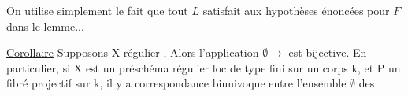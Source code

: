 On utilise simplement le fait que tout $\underline{L}$ satisfait aux 
hypothèses énoncées pour $\underline{F}$ dans le lemme...

\uline{Corollaire}  Supposons  X régulier\hand{)} , Alors l'application $\emptyset \to$  est bijective. En particulier, si X est
un préschéma régulier loc de type fini sur un corps k, et P un fibré
projectif sur k, il y a correspondance biunivoque entre l'ensemble $\emptyset$ des


